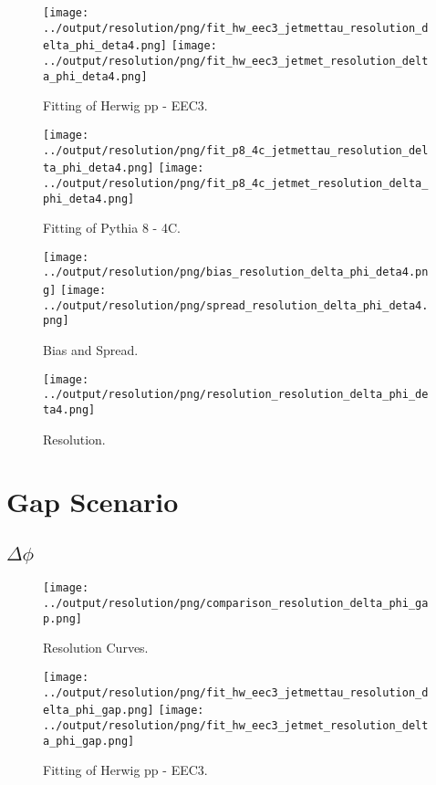 \documentclass[11pt]{book}
\begin{document}
\begin{figure}[ht]
\centering
\texttt{[image: ../output/resolution/png/fit\_hw\_eec3\_jetmettau\_resolution\_delta\_phi\_deta4.png]}
\texttt{[image: ../output/resolution/png/fit\_hw\_eec3\_jetmet\_resolution\_delta\_phi\_deta4.png]}
\caption{Fitting of Herwig pp - EEC3.}
\end{figure}

\begin{figure}[ht]
\centering
\texttt{[image: ../output/resolution/png/fit\_p8\_4c\_jetmettau\_resolution\_delta\_phi\_deta4.png]}
\texttt{[image: ../output/resolution/png/fit\_p8\_4c\_jetmet\_resolution\_delta\_phi\_deta4.png]}
\caption{Fitting of Pythia 8 - 4C.}
\end{figure}

\begin{figure}[ht]
\centering
\texttt{[image: ../output/resolution/png/bias\_resolution\_delta\_phi\_deta4.png]}
\texttt{[image: ../output/resolution/png/spread\_resolution\_delta\_phi\_deta4.png]}
\caption{Bias and Spread.}
\end{figure}


\begin{figure}[ht]
\centering
\texttt{[image: ../output/resolution/png/resolution\_resolution\_delta\_phi\_deta4.png]}
\caption{Resolution.}
\end{figure}
\clearpage


\chapter{Gap Scenario}
\section{$\Delta\phi$}

\begin{figure}[ht]
\centering
\texttt{[image: ../output/resolution/png/comparison\_resolution\_delta\_phi\_gap.png]}
\caption{Resolution Curves.}
\end{figure}


\begin{figure}[ht]
\centering
\texttt{[image: ../output/resolution/png/fit\_hw\_eec3\_jetmettau\_resolution\_delta\_phi\_gap.png]}
\texttt{[image: ../output/resolution/png/fit\_hw\_eec3\_jetmet\_resolution\_delta\_phi\_gap.png]}
\caption{Fitting of Herwig pp - EEC3.}
\end{figure}
\end{document}
